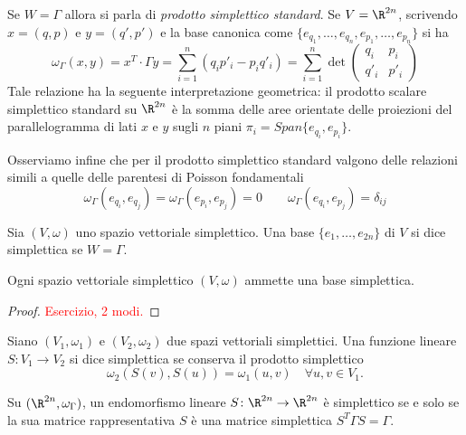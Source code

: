 Se $ W = \Gamma $ allora si parla di \emph{prodotto simplettico standard}. Se $ V = \R^{2n} $, scrivendo $ x = (q, p) $ e $ y = (q', p') $ e la base canonica come $ \{e_{q_1}, \ldots, e_{q_n}, e_{p_1}, \ldots, e_{p_n}\} $ si ha
\begin{equation}
    \omega_\Gamma(x, y) = x^T \cdot \Gamma y = \sum_{i=1}^{n} \left(q_i p'_i - p_i q'_i\right) =
    \sum_{i=1}^{n}
    \det{
    \begin{pmatrix}
    q_i & p_i \\
    q'_i & p'_i
    \end{pmatrix}
    }
\end{equation}
Tale relazione ha la seguente interpretazione geometrica: il prodotto scalare simplettico standard su $ \R^{2n} $ è la somma delle aree orientate delle proiezioni del parallelogramma di lati $ x $ e $ y $ sugli $ n $ piani $ \pi_i = Span\{e_{q_i}, e_{p_i}\} $.

Osserviamo infine che per il prodotto simplettico standard valgono delle relazioni simili a quelle delle parentesi di Poisson fondamentali
\begin{equation}
    \omega_\Gamma(e_{q_i}, e_{q_j}) = \omega_\Gamma(e_{p_i}, e_{p_j}) = 0 \qquad \omega_\Gamma(e_{q_i}, e_{p_j}) = \delta_{ij}
\end{equation}

\begin{definition}
    Sia $ (V, \omega) $ uno spazio vettoriale simplettico. Una base $ \{e_1, \ldots, e_{2n}\} $ di $ V $ si dice simplettica se $ W = \Gamma $.
\end{definition}

\begin{thm}
    Ogni spazio vettoriale simplettico $ (V, \omega) $ ammette una base simplettica.
\end{thm}
\begin{proof}
    \textcolor{red}{Esercizio, 2 modi.}
\end{proof}

\begin{definition}
    Siano $ (V_1, \omega_1) $ e $ (V_2, \omega_2) $ due spazi vettoriali simplettici. Una funzione lineare $ S \colon V_1 \to V_2 $ si dice simplettica se conserva il prodotto simplettico
    \[
        \omega_2(S(v), S(u)) = \omega_1(u, v) \quad \forall u, v \in V_1.
    \]
\end{definition}

\begin{proposition}
    Su $ (\R^{2n}, \omega_\Gamma) $, un endomorfismo lineare $ S \colon \R^{2n} \to \R^{2n} $ è simplettico se e solo se la sua matrice rappresentativa $ S $ è una matrice simplettica $ S^T \Gamma S = \Gamma $.
\end{proposition}

